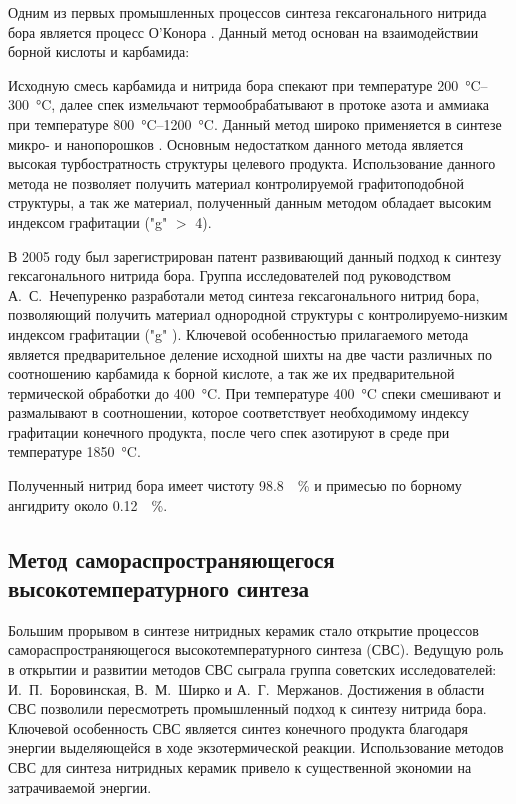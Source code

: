 Одним из первых промышленных процессов синтеза гексагонального нитрида бора является
процесс О'Конора \cite[]{edmond_process_1966}. Данный метод основан на взаимодействии 
борной кислоты и карбамида:


Исходную смесь карбамида и нитрида бора спекают при температуре 
\SIrange{200}{300}{\degreeCelsius}, далее спек измельчают термообрабатывают в протоке 
азота и аммиака при температуре \SIrange{800}{1200}{\degreeCelsius}. Данный метод
широко применяется в синтезе микро- и нанопорошков . Основным недостатком
данного метода является высокая турбостратность структуры целевого продукта.
Использование данного метода не позволяет получить материал контролируемой 
графитоподобной структуры, а так же материал, полученный данным методом 
обладает высоким индексом графитации ("g" $>$ 4).  


В 2005 году был зарегистрирован патент \cite[]{_ru__2005} развивающий данный 
подход к синтезу гексагонального нитрида бора. Группа исследователей под
руководством А.~С.~Нечепуренко разработали метод синтеза гексагонального нитрид
бора, позволяющий получить материал однородной структуры с контролируемо-низким
индексом графитации ("g" ). Ключевой особенностью прилагаемого метода
является предварительное деление исходной шихты  на две части 
различных по соотношению карбамида к борной кислоте, а так же их предварительной
термической обработки до \SI{400}{\degreeCelsius}. При температуре \SI{400}{\degreeCelsius}
спеки смешивают и размалывают в соотношении, которое соответствует необходимому 
индексу графитации конечного продукта, после чего спек азотируют в среде 
при температуре \SI{1850}{\degreeCelsius}.

Полученный нитрид бора имеет чистоту \SI{98.8}{\%} и примесью по 
борному ангидриту около \SI{0.12}{\%}.

\subsection{Метод самораспространяющегося высокотемпературного синтеза}%
\label{sub:Метод самораспространяющегося высокотемпературного синтеза}

Большим прорывом в синтезе нитридных керамик стало открытие процессов
самораспространяющегося высокотемпературного синтеза (СВС). Ведущую роль
в открытии и развитии методов СВС сыграла группа советских
исследователей: И.~П.~Боровинская, В.~М.~Ширко и А.~Г.~Мержанов. Достижения
в области СВС позволили пересмотреть промышленный подход к синтезу нитрида
бора. Ключевой особенность СВС является синтез конечного продукта благодаря
энергии выделяющейся в ходе экзотермической реакции. Использование методов 
СВС для синтеза нитридных керамик привело к существенной экономии на затрачиваемой
энергии.


